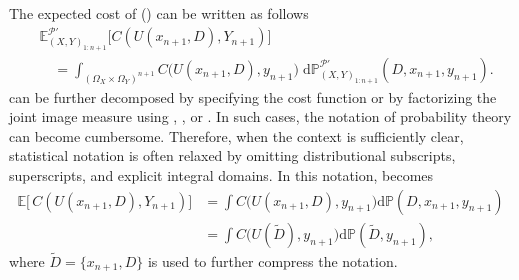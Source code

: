 \newpage
\begin{remark}
	\label{rem:notation}
	The expected cost of  () can be written as follows
	\begin{equation}
		\begin{split}
			&\mathbb{E}_{(X,Y)_{1\colon n+1}}^{\mathcal{P}'}\big[C(U(x_{n+1},D),Y_{n+1})\big] \\
			&\quad= \int_{(\Omega_X\times\Omega_Y)^{n+1}}
			C\big(U(x_{n+1},D),y_{n+1}\big)\;
			\mathrm{d}\mathbb{P}_{(X,Y)_{1\colon n+1}}^{\mathcal{P}'}(D,x_{n+1},y_{n+1}).
		\end{split}
		\label{eq:expcost2}
	\end{equation}
	 can be further decomposed by specifying the cost function or by factorizing the joint image measure using , , or . In such cases, the notation of probability theory can become cumbersome. Therefore, when the context is sufficiently clear, statistical notation is often relaxed by omitting distributional subscripts, superscripts, and explicit integral domains. In this notation,  becomes
	\begin{equation}
		\begin{split}
			\mathbb{E}\big[\,C(U(x_{n+1},D) ,Y_{n+1})\big] &= \int C\big(U(x_{n+1},D),y_{n+1}\big) \mathrm{d}\mathbb{P}(D,x_{n+1},y_{n+1})\\
			&= \int C\big(U(\tilde{D}),y_{n+1}\big) \mathrm{d}\mathbb{P}(\tilde{D},y_{n+1}),
		\end{split}
		\label{eq:expcost3}
	\end{equation}	
	where $\tilde{D}= \{x_{n+1},D\}$ is used to further compress the notation.
\end{remark}

